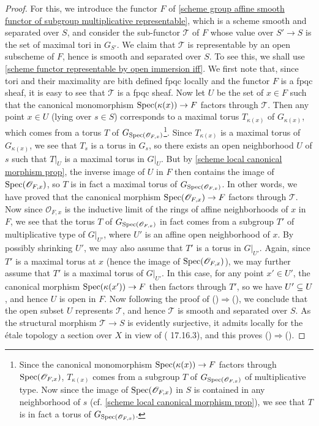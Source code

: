 \begin{proof}
For this, we introduce the functor $F$ of \cref{scheme group affine smooth functor of subgroup multiplicative representable}, which is a scheme smooth and separated over $S$, and consider the sub-functor $\mathscr{T}$ of $F$ whose value over $S'\to S$ is the set of maximal tori in $G_{S'}$. We claim that $\mathscr{T}$ is representable by an open subscheme of $F$, hence is smooth and separated over $S$. To see this, we shall use \cref{scheme functor representable by open immersion iff}. We first note that, since tori and their maximality are bith defined fpqc locally and the functor $F$ is a fpqc sheaf, it is easy to see that $\mathscr{T}$ is a fpqc sheaf. Now let $U$ be the set of $x\in F$ such that the canonical monomorphism $\mathrm{Spec}(\kappa(x))\to F$ factors through $\mathscr{T}$. Then any point $x\in U$ (lying over $s\in S$) corresponds to a maximal torus $T_{\kappa(x)}$ of $G_{\kappa(x)}$, which comes from a torus $T$ of $G_{\mathrm{Spec}(\mathscr{O}_{F,x})}$\footnote{Since the canonical monomorphism $\mathrm{Spec}(\kappa(x))\to F$ factors through $\mathrm{Spec}(\mathscr{O}_{F,x})$, $T_{\kappa(x)}$ comes from a subgroup $T$ of $G_{\mathrm{Spec}(\mathscr{O}_{F,x})}$ of multiplicative type. Now since the image of $\mathrm{Spec}(\mathscr{O}_{F,x})$ in $S$ is contained in any neighborhood of $s$ (cf. \cref{scheme local canonical morphism prop}), we see that $T$ is in fact a torus of $G_{\mathrm{Spec}(\mathscr{O}_{F,x})}$.}. Since $T_{\kappa(x)}$ is a maximal torus of $G_{\kappa(x)}$, we see that $T_s$ is a torus in $G_s$, so there exists an open neighborhood $U$ of $s$ such that $T|_U$ is a maximal torus in $G|_U$. But by \cref{scheme local canonical morphism prop}, the inverse image of $U$ in $F$ then contains the image of $\mathrm{Spec}(\mathscr{O}_{F,x})$, so $T$ is in fact a maximal torus of $G_{\mathrm{Spec}(\mathscr{O}_{F,x})}$. In other words, we have proved that the canonical morphism $\mathrm{Spec}(\mathscr{O}_{F,x})\to F$ factors through $\mathscr{T}$. Now since $\mathscr{O}_{F,x}$ is the inductive limit of the rings of affine neighborhoods of $x$ in $F$, we see that the torus $T$ of $G_{\mathrm{Spec}(\mathscr{O}_{F,x})}$ in fact comes from a subgroup $T'$ of multiplicative type of $G|_{U'}$, where $U'$ is an affine open neighborhood of $x$. By possibly shrinking $U'$, we may also assume that $T'$ is a torus in $G|_{U'}$. Again, since $T'$ is a maximal torus at $x$ (hence the image of $\mathrm{Spec}(\mathscr{O}_{F,x})$), we may further assume that $T'$ is a maximal torus of $G|_{U'}$. In this case, for any point $x'\in U'$, the canonical morphism $\mathrm{Spec}(\kappa(x'))\to F$ then factors through $T'$, so we have $U'\subseteq U$, and hence $U$ is open in $F$. Now following the proof of ()$\Rightarrow$(), we conclude that the open subset $U$ represents $\mathscr{T}$, and hence $\mathscr{T}$ is smooth and separated over $S$. As the structural morphism $\mathscr{T}\to S$ is evidently surjective, it admits locally for the \'etale topology a section over $X$ in view of (\cite{EGA4-4} 17.16.3), and this proves ()$\Rightarrow$().\par

\end{proof}
